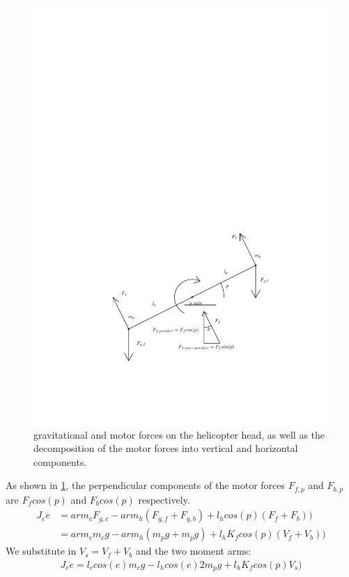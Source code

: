 \begin{figure}[H]
  \caption{gravitational and motor forces on the helicopter head, as
    well as the decomposition of the motor forces into vertical and
    horizontal components.}
  \label{fig:pitch_model}
  \includegraphics[width=1\textwidth]{images/pitch_model}
\end{figure}
%
As shown in \cref{fig:pitch_model}, the perpendicular components of the
motor forces $F_{f,p}$ and $F_{b,p}$ are $F_fcos(p)$ and $F_bcos(p)$
respectively.
%
\begin{align*}
  J_e\ddot{e} &= arm_cF_{g,c} - arm_h(F_{g,f}+F_{g,b}) + l_hcos(p)(F_f + F_b)) \\
              &= arm_cm_cg - arm_h(m_pg + m_pg) + l_hK_fcos(p)(V_f + V_b))
\end{align*}
%
We substitute in $V_s = V_f + V_b$ and the two moment arms:
%
\begin{align*}
  J_e\ddot{e} = l_ccos(e)m_cg - l_hcos(e)2m_pg + l_hK_fcos(p)V_s)
\end{align*}
